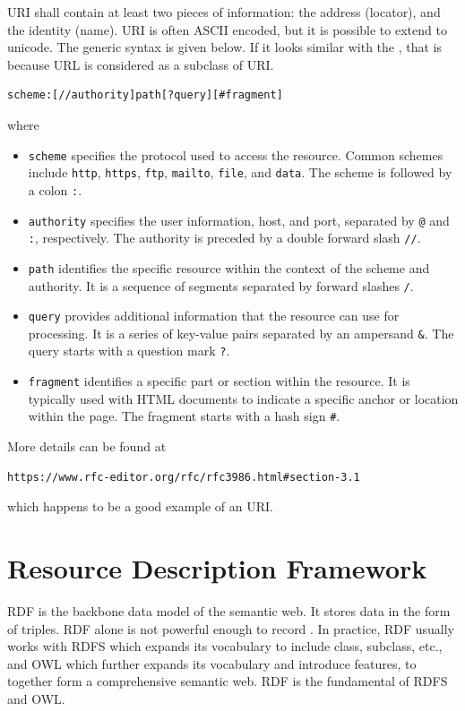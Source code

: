 URI shall contain at least two pieces of information: the address (locator), and the identity (name). URI is often ASCII encoded, but it is possible to extend to unicode. The generic syntax is given below. If it looks similar with the , that is because URL is considered as a subclass of URI.
\begin{lstlisting}
scheme:[//authority]path[?query][#fragment]
\end{lstlisting}
where
\begin{itemize}
\item \verb|scheme| specifies the protocol used to access the resource. Common schemes include \verb|http|, \verb|https|, \verb|ftp|, \verb|mailto|, \verb|file|, and \verb|data|. The scheme is followed by a colon \verb|:|.
\item \verb|authority| specifies the user information, host, and port, separated by \verb|@| and \verb|:|, respectively. The authority is preceded by a double forward slash \verb|//|.
\item \verb|path| identifies the specific resource within the context of the scheme and authority. It is a sequence of segments separated by forward slashes \verb|/|.
\item \verb|query| provides additional information that the resource can use for processing. It is a series of key-value pairs separated by an ampersand \verb|&|. The query starts with a question mark \verb|?|.
\item \verb|fragment| identifies a specific part or section within the resource. It is typically used with HTML documents to indicate a specific anchor or location within the page. The fragment starts with a hash sign \verb|#|.
\end{itemize}
More details can be found at
\begin{lstlisting}
https://www.rfc-editor.org/rfc/rfc3986.html#section-3.1
\end{lstlisting}
which happens to be a good example of an URI.

\section{Resource Description Framework} \label{sec:rdf}

RDF is the backbone data model of the semantic web. It stores data in the form of triples. RDF alone is not powerful enough to record . In practice, RDF usually works with RDFS which expands its vocabulary to include class, subclass, etc., and OWL which further expands its vocabulary and introduce  features, to together form a comprehensive semantic web. RDF is the fundamental of RDFS and OWL.

